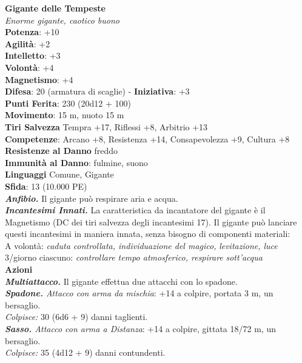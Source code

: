 \begin{multicols}{2}
\medskip\textbf{Gigante delle Tempeste}\\
\emph{Enorme gigante, caotico buono}\\
\textbf{Potenza}: +10\\
\textbf{Agilità}: +2\\
\textbf{Intelletto}: +3\\
\textbf{Volontà}: +4\\
\textbf{Magnetismo}: +4\\
\textbf{Difesa}: 20 (armatura di scaglie) - \textbf{Iniziativa}: +3\\
\textbf{Punti Ferita}: 230 (20d12 + 100)\\
\textbf{Movimento}: 15 m, nuoto 15 m\\
\textbf{Tiri Salvezza} Tempra +17, Riflessi +8, Arbitrio +13\\
\textbf{Competenze}: Arcano +8, Resistenza +14, Consapevolezza +9, Cultura +8\\
\textbf{Resistenze al Danno} freddo\\
\textbf{Immunità al Danno}: fulmine, suono\\
\textbf{Linguaggi} Comune, Gigante\\
\textbf{Sfida}: 13 (10.000 PE)\smallskip\\
\emph{\textbf{Anfibio.}} Il gigante può respirare aria e acqua.\\
\emph{\textbf{Incantesimi Innati.}} La caratteristica da incantatore del gigante è il Magnetismo (DC dei tiri salvezza degli incantesimi 17). Il gigante può lanciare questi incantesimi in maniera innata, senza bisogno di componenti materiali:\\
A volontà: \emph{caduta controllata, individuazione del magico,} \emph{levitazione, luce}\\
3/giorno ciascuno: \emph{controllare tempo atmosferico, respirare} \emph{sott'acqua}\\
\smallskip\textbf{Azioni}\\
\emph{\textbf{Multiattacco.}} Il gigante effettua due attacchi con lo spadone.\\
\emph{\textbf{Spadone.} Attacco con arma da mischia}: +14 a colpire, portata 3 m, un bersaglio.\\
\emph{Colpisce:} 30 (6d6 + 9) danni taglienti.\\
\emph{\textbf{Sasso.} Attacco con arma a Distanza}: +14 a colpire, gittata 18/72 m, un bersaglio.\\
\emph{Colpisce:} 35 (4d12 + 9) danni contundenti.\\

\end{multicols}
